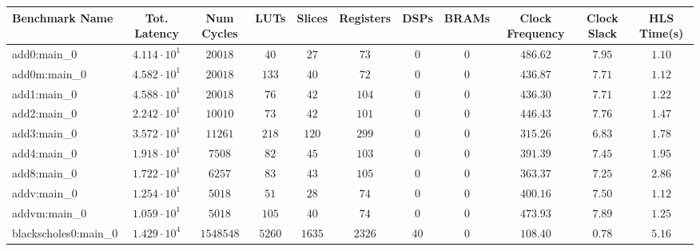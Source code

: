 \begin{tabular}{|l|c|c|c|c|c|c|c|c|c|c|}
\hline
Benchmark Name                 & Tot. Latency           & Num Cycles   & LUTs       & Slices     & Registers  & DSPs     & BRAMs    & Clock Frequency & Clock Slack & HLS Time(s) \\
\hline
add0:main\_0                   & $ 4.114 \cdot 10^{1} $ & $ 20018    $ & $ 40     $ & $ 27     $ & $ 73     $ & $ 0    $ & $ 0    $ & $ 486.62      $ & $ 7.95    $ & $ 1.10    $ \\
add0m:main\_0                  & $ 4.582 \cdot 10^{1} $ & $ 20018    $ & $ 133    $ & $ 40     $ & $ 72     $ & $ 0    $ & $ 0    $ & $ 436.87      $ & $ 7.71    $ & $ 1.12    $ \\
add1:main\_0                   & $ 4.588 \cdot 10^{1} $ & $ 20018    $ & $ 76     $ & $ 42     $ & $ 104    $ & $ 0    $ & $ 0    $ & $ 436.30      $ & $ 7.71    $ & $ 1.22    $ \\
add2:main\_0                   & $ 2.242 \cdot 10^{1} $ & $ 10010    $ & $ 73     $ & $ 42     $ & $ 101    $ & $ 0    $ & $ 0    $ & $ 446.43      $ & $ 7.76    $ & $ 1.47    $ \\
add3:main\_0                   & $ 3.572 \cdot 10^{1} $ & $ 11261    $ & $ 218    $ & $ 120    $ & $ 299    $ & $ 0    $ & $ 0    $ & $ 315.26      $ & $ 6.83    $ & $ 1.78    $ \\
add4:main\_0                   & $ 1.918 \cdot 10^{1} $ & $ 7508     $ & $ 82     $ & $ 45     $ & $ 103    $ & $ 0    $ & $ 0    $ & $ 391.39      $ & $ 7.45    $ & $ 1.95    $ \\
add8:main\_0                   & $ 1.722 \cdot 10^{1} $ & $ 6257     $ & $ 83     $ & $ 43     $ & $ 105    $ & $ 0    $ & $ 0    $ & $ 363.37      $ & $ 7.25    $ & $ 2.86    $ \\
addv:main\_0                   & $ 1.254 \cdot 10^{1} $ & $ 5018     $ & $ 51     $ & $ 28     $ & $ 74     $ & $ 0    $ & $ 0    $ & $ 400.16      $ & $ 7.50    $ & $ 1.12    $ \\
addvm:main\_0                  & $ 1.059 \cdot 10^{1} $ & $ 5018     $ & $ 105    $ & $ 40     $ & $ 74     $ & $ 0    $ & $ 0    $ & $ 473.93      $ & $ 7.89    $ & $ 1.25    $ \\
blackscholes0:main\_0          & $ 1.429 \cdot 10^{4} $ & $ 1548548  $ & $ 5260   $ & $ 1635   $ & $ 2326   $ & $ 40   $ & $ 0    $ & $ 108.40      $ & $ 0.78    $ & $ 5.16    $ \\

\end{tabular}
